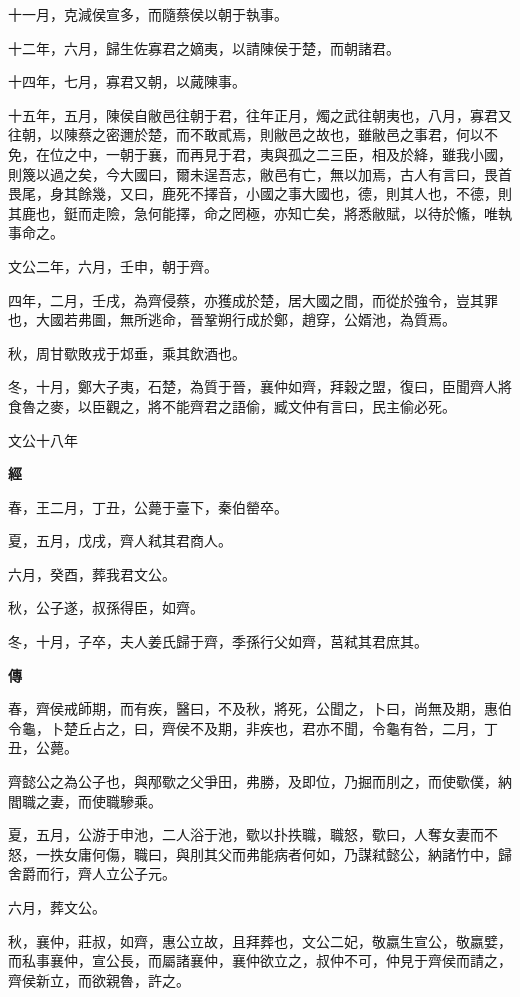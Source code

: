 \documentclass{ctexart}
\begin{document}
十一月，克減侯宣多，而隨蔡侯以朝于執事。

十二年，六月，歸生佐寡君之嫡夷，以請陳侯于楚，而朝諸君。

十四年，七月，寡君又朝，以蕆陳事。

十五年，五月，陳侯自敝邑往朝于君，往年正月，燭之武往朝夷也，八月，寡君又往朝，以陳蔡之密邇於楚，而不敢貳焉，則敝邑之故也，雖敝邑之事君，何以不免，在位之中，一朝于襄，而再見于君，夷與孤之二三臣，相及於絳，雖我小國，則篾以過之矣，今大國曰，爾未逞吾志，敝邑有亡，無以加焉，古人有言曰，畏首畏尾，身其餘幾，又曰，鹿死不擇音，小國之事大國也，德，則其人也，不德，則其鹿也，鋌而走險，急何能擇，命之罔極，亦知亡矣，將悉敝賦，以待於鯈，唯執事命之。

文公二年，六月，壬申，朝于齊。

四年，二月，壬戌，為齊侵蔡，亦獲成於楚，居大國之間，而從於強令，豈其罪也，大國若弗圖，無所逃命，晉鞏朔行成於鄭，趙穿，公婿池，為質焉。

秋，周甘歜敗戎于邥垂，乘其飲酒也。

冬，十月，鄭大子夷，石楚，為質于晉，襄仲如齊，拜穀之盟，復曰，臣聞齊人將食魯之麥，以臣觀之，將不能齊君之語偷，臧文仲有言曰，民主偷必死。





文公十八年


\textbf{經}



春，王二月，丁丑，公薨于臺下，秦伯罃卒。

夏，五月，戊戌，齊人弒其君商人。

六月，癸酉，葬我君文公。

秋，公子遂，叔孫得臣，如齊。

冬，十月，子卒，夫人姜氏歸于齊，季孫行父如齊，莒弒其君庶其。

\textbf{傳}



春，齊侯戒師期，而有疾，醫曰，不及秋，將死，公聞之，卜曰，尚無及期，惠伯令龜，卜楚丘占之，曰，齊侯不及期，非疾也，君亦不聞，令龜有咎，二月，丁丑，公薨。

齊懿公之為公子也，與邴歜之父爭田，弗勝，及即位，乃掘而刖之，而使歜僕，納閻職之妻，而使職驂乘。

夏，五月，公游于申池，二人浴于池，歜以扑抶職，職怒，歜曰，人奪女妻而不怒，一抶女庸何傷，職曰，與刖其父而弗能病者何如，乃謀弒懿公，納諸竹中，歸舍爵而行，齊人立公子元。

六月，葬文公。

秋，襄仲，莊叔，如齊，惠公立故，且拜葬也，文公二妃，敬嬴生宣公，敬嬴嬖，而私事襄仲，宣公長，而屬諸襄仲，襄仲欲立之，叔仲不可，仲見于齊侯而請之，齊侯新立，而欲親魯，許之。
\end{document}
